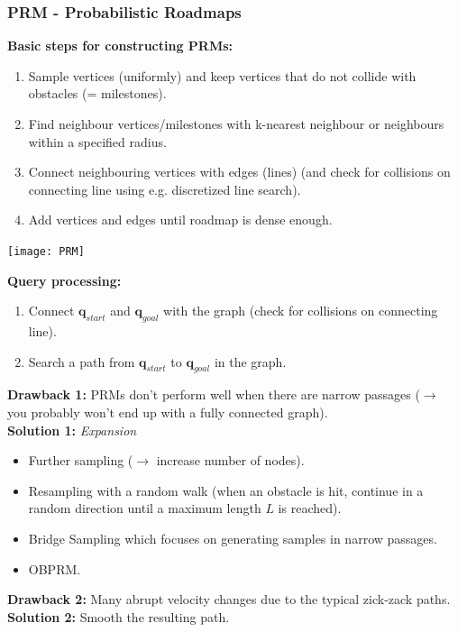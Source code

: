 \begin{multicols*}{2}
\subsubsection{PRM - Probabilistic Roadmaps}
\textbf{Basic steps for constructing PRMs:}
\begin{enumerate}
	\item Sample vertices (uniformly) and keep vertices that do not collide with obstacles (= milestones).
	\item Find neighbour vertices/milestones with
		\subitem k-nearest neighbour or
		\subitem neighbours within a specified radius.
	\item Connect neighbouring vertices with edges (lines) (and check for collisions on connecting line using e.g. discretized line search).
	\item Add vertices and edges until roadmap is dense enough.
\end{enumerate}
\begin{center}
\texttt{[image: PRM]}
\end{center}
\textbf{Query processing:}
\begin{enumerate}
	\item Connect $\mathbold{q}_{start}$ and $\mathbold{q}_{goal}$ with the graph (check for collisions on connecting line).
	\item Search a path from $\mathbold{q}_{start}$ to $\mathbold{q}_{goal}$ in the graph.
\end{enumerate}
\textbf{Drawback 1:} PRMs don't perform well when there are narrow passages ($\rightarrow$ you probably won't end up with a fully connected graph).\\
\textbf{Solution 1:} \textit{Expansion}
\begin{itemize}
	\item Further sampling ($\rightarrow$ increase number of nodes).
	\item Resampling with a random walk (when an obstacle is hit, continue in a random direction until a maximum length $L$ is reached).
	\item Bridge Sampling which focuses on generating samples in narrow passages.
	\item OBPRM.
\end{itemize}

\textbf{Drawback 2:} Many abrupt velocity changes due to the typical zick-zack paths.\\
\textbf{Solution 2:} Smooth the resulting path.\par


\end{multicols*}
